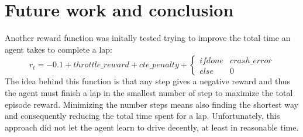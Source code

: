 \chapter{Future work and conclusion}



Another reward function was initally tested trying to improve the total time an agent takes to complete a lap:
\begin{equation}
  \label{eq:testreward}
  r_t = - 0.1 + throttle\_reward + cte\_penalty + \left\{\begin{matrix}
    if done & crash\_error \\ 
    else & 0  
    \end{matrix}\right.
\end{equation}
The idea behind this function is that any step gives a negative reward and thus the agent must finish a lap in the smallest number of step to maximize the total episode reward. Minimizing the number steps means also finding the shortest way and consequently reducing the total time spent for a lap. Unfortunately, this approach did not let the agent learn to drive decently, at least in reasonable time.